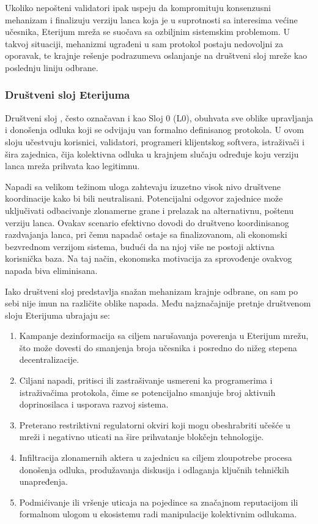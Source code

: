 Ukoliko nepošteni validatori ipak uspeju da kompromituju konsenzusni mehanizam i finalizuju verziju lanca koja je u suprotnosti sa interesima većine učesnika, Eterijum mreža se suočava sa ozbiljnim sistemskim problemom. U takvoj situaciji, mehanizmi ugrađeni u sam protokol postaju nedovoljni za oporavak, te krajnje rešenje podrazumeva oslanjanje na društveni sloj mreže kao poslednju liniju odbrane.

\subsubsection{Društveni sloj Eterijuma}
Društveni sloj , često označavan i kao Sloj 0 (L0), obuhvata sve oblike upravljanja i donošenja odluka koji se odvijaju van formalno definisanog protokola. U ovom sloju učestvuju korisnici, validatori, programeri klijentskog softvera, istraživači i šira zajednica, čija kolektivna odluka u krajnjem slučaju određuje koju verziju lanca mreža prihvata kao legitimnu.

Napadi sa velikom težinom uloga zahtevaju izuzetno visok nivo društvene koordinacije kako bi bili neutralisani. Potencijalni odgovor zajednice može uključivati odbacivanje zlonamerne grane i prelazak na alternativnu, poštenu verziju lanca. Ovakav scenario efektivno dovodi do društveno koordinisanog razdvajanja lanca, pri čemu napadač ostaje sa finalizovanom, ali ekonomski bezvrednom verzijom sistema, budući da na njoj više ne postoji aktivna korisnička baza. Na taj način, ekonomska motivacija za sprovođenje ovakvog napada biva eliminisana.

Iako društveni sloj predstavlja snažan mehanizam krajnje odbrane, on sam po sebi nije imun na različite oblike napada. Među najznačajnije pretnje društvenom sloju Eterijuma ubrajaju se:
\begin{enumerate}
\item Kampanje dezinformacija sa ciljem narušavanja poverenja u Eterijum mrežu, što može dovesti do smanjenja broja učesnika i posredno do nižeg stepena decentralizacije.
\item Ciljani napadi, pritisci ili zastrašivanje usmereni ka programerima i istraživačima protokola, čime se potencijalno smanjuje broj aktivnih doprinosilaca i usporava razvoj sistema.
\item Preterano restriktivni regulatorni okviri koji mogu obeshrabriti učešće u mreži i negativno uticati na šire prihvatanje blokčejn tehnologije.
\item Infiltracija zlonamernih aktera u zajednicu sa ciljem zloupotrebe procesa donošenja odluka, produžavanja diskusija i odlaganja ključnih tehničkih unapređenja.
\item Podmićivanje ili vršenje uticaja na pojedince sa značajnom reputacijom ili formalnom ulogom u ekosistemu radi manipulacije kolektivnim odlukama.
\end{enumerate}

